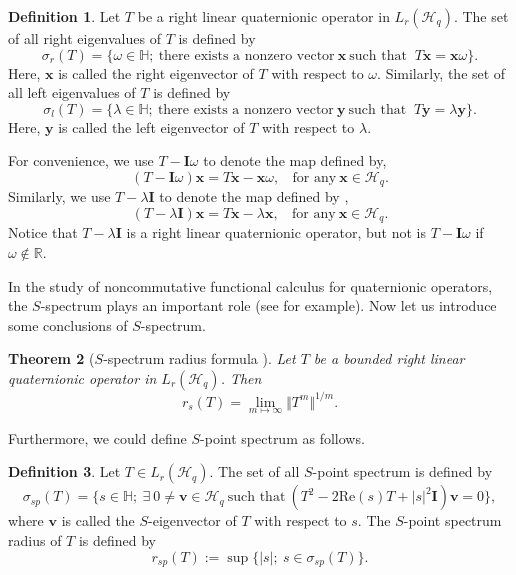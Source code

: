 \documentclass[pdflatex,sn-mathphys-num]{sn-jnl}%
\theoremstyle{thmstyleone}%
\newtheorem{theorem}{Theorem}%
\theoremstyle{thmstyletwo}%
\theoremstyle{thmstylethree}%
\newtheorem{definition}{Definition}%
\newtheorem{theorem}{Theorem}[section]
\theoremstyle{definition}
\newtheorem{definition}[theorem]{Definition}
\theoremstyle{remark}
\begin{document}
\begin{definition}\label{LRESP}
Let $T$ be a right linear quaternionic operator in $L_r(\mathcal{H}_q)$. The set of all right eigenvalues of $T$ is defined by
\[
\sigma_r(T)=\{\omega\in\mathbb{H};\ \text{there exists a nonzero vector}\ \boldsymbol{x}\ \text{such that }\ T\boldsymbol{x}=\boldsymbol{x}\omega\}.
\]
Here, $\boldsymbol{x}$ is called the right eigenvector of $T$ with respect to $\omega$.
Similarly, the set of all left eigenvalues of $T$ is defined by
\[
\sigma_l(T)=\{\lambda\in\mathbb{H};\ \text{there exists a nonzero vector}\ \boldsymbol{y}\ \text{such that }\ T\boldsymbol{y}=\lambda\boldsymbol{y}\}.
\]
Here, $\boldsymbol{y}$ is called the left eigenvector of $T$ with respect to $\lambda$.
\end{definition}
For convenience, we use $T-\mathbf{I}\omega$ to denote the map defined by,
\[
(T-\mathbf{I}\omega)\boldsymbol{x}=T\boldsymbol{x}-\boldsymbol{x}\omega, \ \ \  \  \text{for any} \ \boldsymbol{x}\in\mathcal{H}_q.
\]
Similarly, we use $T-\lambda\mathbf{I}$ to denote the map defined by ,
\[
(T-\lambda\mathbf{I})\boldsymbol{x}=T\boldsymbol{x}-\lambda\boldsymbol{x}, \ \ \  \  \text{for any} \ \boldsymbol{x}\in\mathcal{H}_q.
\]
Notice that $T-\lambda\mathbf{I}$ is a right linear quaternionic operator, but not is $T-\mathbf{I}\omega$ if $\omega\notin\mathbb{R}$.

In the study of noncommutative functional calculus for quaternionic operators, the $S$-spectrum plays an important role (see \cite{CSS} for example).
Now let us introduce some conclusions of  $S$-spectrum.

\begin{theorem}[$S$-spectrum radius formula \cite{CGSS}]\label{SMT}
	Let $T$ be a bounded right linear quaternionic operator in $L_r(\mathcal{H}_q)$. Then
	\[
	r_s(T)=\lim_{m\mapsto\infty}\Vert T^m \Vert^{{1}/{m}}.
	\]
\end{theorem}

Furthermore, we could define $S$-point spectrum as follows.

\begin{definition}
Let $T\in L_r(\mathcal{H}_q)$. The set of all $S$-point spectrum is defined by
	$$\sigma_{sp}(T)=\{s\in\mathbb{H};\ \exists\ 0\neq\boldsymbol{v}\in\mathcal{H}_q \ \text{such that}\ (T^2-2\mathrm{Re}(s)T+|s|^2\boldsymbol{I})\boldsymbol{v}=0\},$$
where $\boldsymbol{v}$ is called the $S$-eigenvector of $T$ with respect to $s$.
The $S$-point spectrum radius of $T$ is defined by
\[
r_{sp}(T):=\sup\{|s|;\ s\in\sigma_{sp}(T)\}.
\]
\end{definition}
\end{document}

